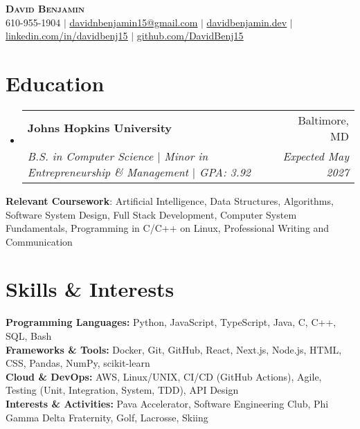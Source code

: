 \documentclass[letterpaper,10pt]{article}
\makeatletter
\newcommand{\resumeItem}[1]{
  \item\small{
    {#1 \vspace{-2pt}}
  }
}
\newcommand{\resumeSubheading}[4]{
  \vspace{-2pt}\item
    \begin{tabular*}{0.97\textwidth}[t]{l@{\extracolsep{\fill}}r}
      \textbf{#1} & #2 \\
      \textit{\small#3} & \textit{\small #4} \\
    \end{tabular*}\vspace{-7pt}
}
\newcommand{\resumeSubHeadingListStart}{\begin{itemize}[leftmargin=0.15in, label={}]}
\newcommand{\resumeSubHeadingListEnd}{\end{itemize}}
\newcommand{\resumeItemListStart}{\begin{itemize}}
\newcommand{\resumeItemListEnd}{\end{itemize}\vspace{-5pt}}
\makeatother
\begin{document}
\begin{center}
    \textbf{\Huge \scshape David Benjamin} \\ \vspace{1pt}
    \small 610-955-1904 $|$ \href{mailto:davidnbenjamin15@gmail.com}{\underline{davidnbenjamin15@gmail.com}} $|$ 
    \href{https://davidbenjamin.dev}{\underline{davidbenjamin.dev}} $|$
    \href{https://www.linkedin.com/in/davidbenj15/}{\underline{linkedin.com/in/davidbenj15}} $|$
    \href{https://github.com/DavidBenj15}{\underline{github.com/DavidBenj15}}
\end{center}

\section{Education}
  \resumeSubHeadingListStart
    \resumeSubheading
      {Johns Hopkins University}{Baltimore, MD}
      {B.S. in Computer Science $|$ Minor in Entrepreneurship \& Management $|$ GPA: 3.92}{Expected May 2027}
  \resumeSubHeadingListEnd


    \begin{itemize}[leftmargin=0.15in, label={}]
    \small{
        \item{
            \textbf{Relevant Coursework}: Artificial Intelligence, Data Structures, Algorithms, Software System Design, Full Stack Development, Computer System Fundamentals, Programming in C/C++ on Linux, Professional Writing and Communication
        }
    }
\end{itemize}

\section{Skills \& Interests}
\begin{itemize}[leftmargin=0.15in, label={}]
    \small{
        \item{
            \textbf{Programming Languages:} Python, JavaScript, TypeScript, Java, C, C++, SQL, Bash \\
            \textbf{Frameworks \& Tools:} Docker, Git, GitHub, React, Next.js, Node.js, HTML, CSS, Pandas, NumPy, scikit-learn \\
            \textbf{Cloud \& DevOps:} AWS, Linux/UNIX, CI/CD (GitHub Actions), Agile, Testing (Unit, Integration, System, TDD), API Design \\
            \textbf{Interests \& Activities:} Pava Accelerator, Software Engineering Club, Phi Gamma Delta Fraternity, Golf, Lacrosse, Skiing
        }
    }
\end{itemize}
\end{document}
